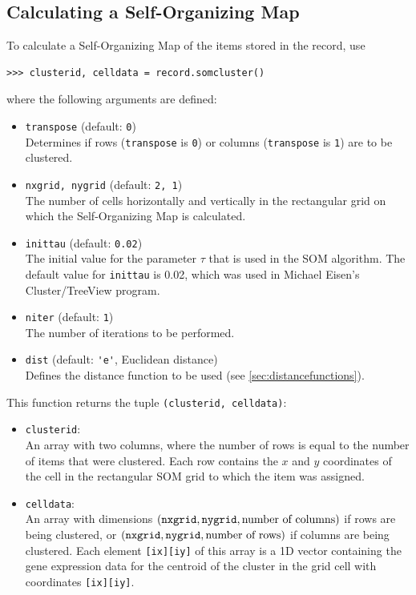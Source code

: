 \documentclass{report}
\begin{document}
\subsection*{Calculating a Self-Organizing Map}

To calculate a Self-Organizing Map of the items stored in the record, use
\begin{verbatim}
>>> clusterid, celldata = record.somcluster()
\end{verbatim}
where the following arguments are defined:
\begin{itemize}
\item \verb|transpose| (default: \verb|0|) \\
Determines if rows (\verb|transpose| is \verb|0|) or columns (\verb|transpose| is \verb|1|) are to be clustered.
\item \verb|nxgrid, nygrid| (default: \verb|2, 1|) \\
The number of cells horizontally and vertically in the rectangular grid on which the Self-Organizing Map is calculated.
\item \verb|inittau| (default: \verb|0.02|) \\
The initial value for the parameter $\tau$ that is used in the SOM algorithm. The default value for \verb|inittau| is 0.02, which was used in Michael Eisen's Cluster/TreeView program.
\item \verb|niter| (default: \verb|1|) \\
The number of iterations to be performed.
\item \verb|dist| (default: \verb|'e'|, Euclidean distance) \\
Defines the distance function to be used (see \ref{sec:distancefunctions}).
\end{itemize}

This function returns the tuple \verb|(clusterid, celldata)|:
\begin{itemize}
\item \verb|clusterid|: \\
An array with two columns, where the number of rows is equal to the number of items that were clustered. Each row contains the $x$ and $y$ coordinates of the cell in the rectangular SOM grid to which the item was assigned.
\item  \verb|celldata|: \\
An array with dimensions $\left(\verb|nxgrid|, \verb|nygrid|, \textrm{number of columns}\right)$ if rows are being clustered, or $\left(\verb|nxgrid|, \verb|nygrid|, \textrm{number of rows}\right)$ if columns are being clustered. Each element \verb|[ix][iy]| of this array is a 1D vector containing the gene expression data for the centroid of the cluster in the grid cell with coordinates \verb|[ix][iy]|.
\end{itemize}
\end{document}
